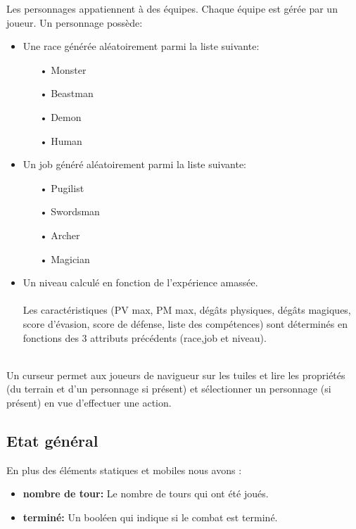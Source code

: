 Les personnages appatiennent à des équipes. Chaque équipe est gérée par un joueur.  
Un personnage possède:
\\
\begin{itemize}
\item Une race générée aléatoirement parmi la liste suivante:
    \begin{itemize}
         \item[•]  Monster
         \item[•]  Beastman
         \item[•]  Demon
         \item[•]  Human
         \\
     \end{itemize}

\item Un job généré aléatoirement parmi la liste suivante:
    \begin{itemize}
         \item[•]  Pugilist
         \item[•]  Swordsman
         \item[•]  Archer
         \item[•]  Magician
         \\
     \end{itemize}
\item Un niveau calculé en fonction de l'expérience amassée.
\\ \\
Les caractéristiques (PV max, PM max, dégâts physiques, dégâts magiques, score d'évasion, score de défense, liste des compétences) sont déterminés en fonctions des 3 attributs précédents (race,job et niveau).
\\
\end{itemize}
\\
Un curseur permet aux joueurs de navigueur sur les tuiles et lire les propriétés (du terrain et d'un personnage si présent) et sélectionner un personnage (si présent) en vue d'effectuer une action.


\subsection{Etat général}
En plus des éléments statiques et mobiles nous avons :
\begin{itemize}
         \item \textbf{nombre de tour:} Le nombre de tours qui ont été joués.
         \\
         \item \textbf{terminé:} Un booléen qui indique si le combat est terminé.
\end{itemize}

